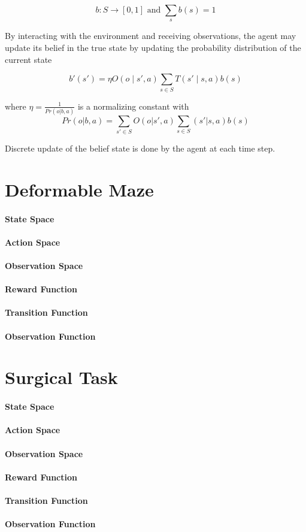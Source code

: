 $$b : S \rightarrow [0,1] \text{ and } \sum_s b(s) = 1  $$

By interacting with the environment and receiving observations, the agent may update its belief in the true state by updating the probability distribution of the current state

$$ b'(s')=\eta O(o\mid s',a)\sum _{s\in S}T(s'\mid s,a)b(s)$$

where $\eta = \frac{1}{Pr ( o | b , a )}$ is a normalizing constant with 
$$Pr ( o | b , a ) = \sum_{s'\in S} O ( o | s' , a ) \sum_{s \in S}( s'|s,a)b(s)$$

Discrete update of the belief state is done by the agent at each time step.


\section{Deformable Maze}

\paragraph{State Space}
\paragraph{Action Space}
\paragraph{Observation Space}
\paragraph{Reward Function}
\paragraph{Transition Function}
\paragraph{Observation Function}
\section{Surgical Task}

\paragraph{State Space}
\paragraph{Action Space}
\paragraph{Observation Space}
\paragraph{Reward Function}
\paragraph{Transition Function}
\paragraph{Observation Function}

